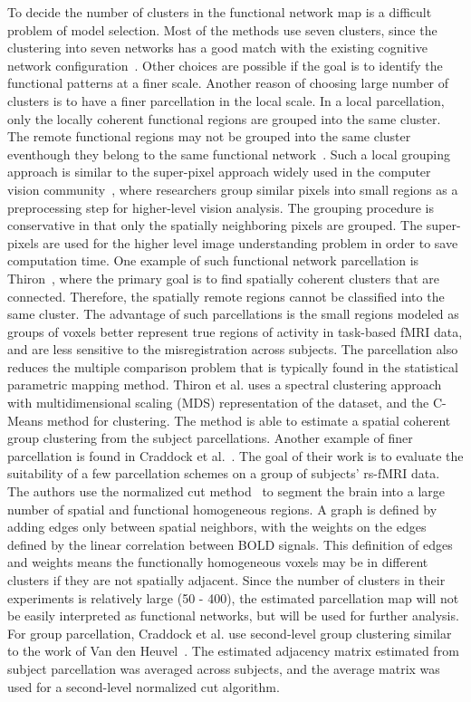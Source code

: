To decide the number of clusters in the functional network map is a difficult
problem of model selection. Most of the methods use seven clusters, since the
clustering into seven networks has a good match with the existing cognitive network
configuration~\cite{yeo2011organization}. Other choices are possible if the goal
is to identify the functional patterns at a finer scale. Another reason of
choosing large number of clusters is to have a finer parcellation in the local
scale. In a local parcellation, only the locally coherent functional regions are
grouped into the same cluster. The remote functional regions may not be grouped
into the same cluster eventhough they belong to the same functional
network~\cite{mezer2009cluster}. Such a local grouping approach is similar to the
super-pixel approach widely used in the computer vision
community~\cite{levinshtein2009turbopixels, achanta2012slic}, where researchers
group similar pixels into small regions as a preprocessing step for higher-level
vision analysis. The grouping procedure is conservative in that only the
spatially neighboring pixels are grouped. The super-pixels are used for the
higher level image understanding problem in order to save computation time. One
example of such functional network parcellation is
Thiron~\cite{thirion2006dealing}, where the primary goal is to find spatially
coherent clusters that are connected. Therefore, the spatially remote regions
cannot be classified into the same cluster. The advantage of such parcellations
is the small regions modeled as groups of voxels better represent true regions
of activity in task-based fMRI data, and are less sensitive to the
misregistration across subjects. The parcellation also reduces the multiple
comparison problem that is typically found in the statistical parametric mapping
method. Thiron et al. uses a spectral clustering approach with multidimensional
scaling (MDS) representation of the dataset, and the C-Means method for
clustering. The method is able to estimate a spatial coherent group clustering
from the subject parcellations. Another example of finer parcellation is found
in Craddock et al.~\cite{craddock2012whole}. The goal of their work is to
evaluate the suitability of a few parcellation schemes on a group of subjects'
rs-fMRI data. The authors use the normalized cut method~\cite{shi2000normalized}
to segment the brain into a large number of spatial and functional homogeneous
regions. A graph is defined by adding edges only between spatial neighbors, with
the weights on the edges defined by the linear correlation between BOLD
signals. This definition of edges and weights means the functionally homogeneous
voxels may be in different clusters if they are not spatially adjacent. Since
the number of clusters in their experiments is relatively large (50 - 400), the
estimated parcellation map will not be easily interpreted as functional
networks, but will be used for further analysis. For group parcellation,
Craddock et al. use second-level group clustering similar to the work of Van
den Heuvel~\cite{van2008normalized}. The estimated adjacency matrix estimated
from subject parcellation was averaged across subjects, and the average matrix
was used for a second-level normalized cut algorithm.


